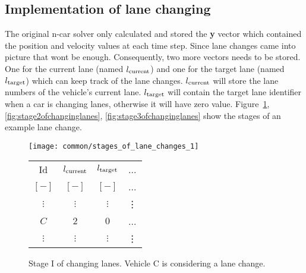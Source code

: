		\subsection*{Implementation of lane changing}
		The original n-car solver only calculated and stored the \textbf{y} vector which contained the position and velocity values at each time step. Since lane changes came into picture that wont be enough. Consequently, two more vectors needs to be stored. One for the current lane (named $l_{\rm current}$) and one for the target lane (named $l_{\rm target}$) which can keep track of the lane changes. $l_{\rm current}$ will store the lane numbers of the vehicle's current lane. $l_{\rm target}$ will contain the target lane identifier when a car is changing lanes, otherwise it will have zero value. Figure~\ref{fig:stage1ofchanginglanes}, \ref{fig:stage2ofchanginglanes}, \ref{fig:stage3ofchanginglanes} show the stages of an example lane change.
		\begin{figure}
			\begin{center}
				\begin{minipage}{.65\textwidth}
					\texttt{[image: common/stages\_of\_lane\_changes\_1]}
				\end{minipage}\quad
				\begin{minipage}{.3\textwidth}
					\begin{tabular}{ |c|c|c|c| }
						\hline
						Id & $l_{\rm current}$ & $l_{\rm target}$ & ... \\
						$[-]$ & $[-]$ & $[-]$ & ...\\
						\hline
						$\vdots$ & $\vdots$ & $\vdots$ & \vdots\\
						$C$ & $2$ & $0$ & ...\\
						$\vdots$ & $\vdots$ & $\vdots$ & \vdots\\
						\hline
					\end{tabular}
				\end{minipage}
			\end{center}
			\caption{Stage I of changing lanes. Vehicle C is considering a lane change.}
			\label{fig:stage1ofchanginglanes}
		\end{figure}
